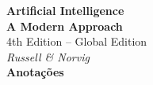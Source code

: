 \documentclass[12pt]{article}
\begin{document}
\begin{titlepage}
    \begin{center}
        {\Huge\bfseries\color{aiBlue}Artificial Intelligence}\\
        \vspace{0.4cm}
        {\Large\textbf{\color{aiGray}A Modern Approach}}\\
        {\large\color{aiBlue}4th Edition -- Global Edition}\\
        \vspace{0.2cm}
        {\color{aiGray}\textit{Russell \& Norvig}}\\
        \vspace{1cm}
        {\large\textbf{Anotações}}\\
        \vfill
    \end{center}
    \tableofcontents
    \thispagestyle{empty}
\end{titlepage}


\end{document}
